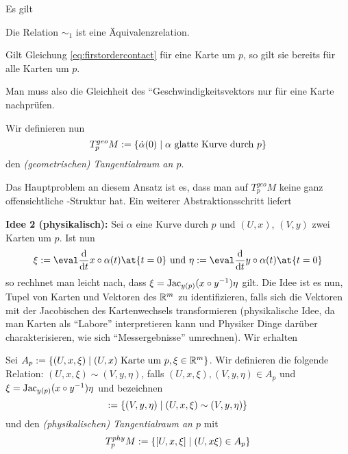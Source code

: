 \begin{proposition}
  Es gilt
  \begin{statements}
  \item Die Relation $\sim_1$ ist eine Äquivalenzrelation.
  \item Gilt Gleichung \eqref{eq:firstordercontact} für eine Karte um
    $p$, so gilt sie bereits für alle Karten um $p$.
  \end{statements}
\end{proposition}
\begin{bemerkung}
  Man muss also die Gleichheit des ``Geschwindigkeitsvektors nur für
  eine Karte nachprüfen.
\end{bemerkung}

\begin{definition}
  Wir definieren nun
  \begin{equation*}
    T^{geo}_pM := \left\lbrace \dot\alpha(0) \mid \alpha \text{ glatte Kurve
        durch $p$} \right\rbrace
  \end{equation*}
  den \emph{(geometrischen) Tangentialraum an $p$}.
\end{definition}

Das Hauptproblem an diesem Ansatz ist es, dass man auf $T^{geo}_pM$ keine ganz
offensichtliche \VR-Struktur hat. Ein weiterer Abstraktionsschritt liefert

\textbf{Idee 2 (physikalisch):} Sei $\alpha$ eine Kurve durch
$p$ und $(U,x)$, $(V,y)$ zwei Karten um $p$. Ist nun
\begin{equation*}
  \xi := \eval\ddt x\circ \alpha(t)\at{t=0}\text{ und }\eta :=
  \eval\ddt y\circ \alpha(t)\at{t=0}
\end{equation*}
so rechhnet man leicht nach, dass $\xi = \operatorname{Jac}_{y(p)}(x\circ
y^{-1})\eta$ gilt. Die Idee ist es nun, Tupel von
Karten und Vektoren des $\mathbb{R}^m$ zu identifizieren, falls sich die
Vektoren mit der Jacobischen des Kartenwechsels transformieren
(physikalische Idee, da man Karten als ``Labore'' interpretieren kann
und Physiker Dinge darüber charakterisieren, wie sich
``Messergebnisse'' umrechnen). Wir erhalten
\begin{definition}
  Sei $A_p := \left\lbrace  (U,x,\xi) \mid (U,x) \text{ Karte um $p$}, \xi \in
    \mathbb{R}^m \right\rbrace$. Wir definieren die folgende Relation: $(U,x,\xi) \sim
  (V,y,\eta)$, falls $(U,x,\xi),(V,y,\eta) \in A_p$ und $\xi =
  \operatorname{Jac}_{y(p)}(x\circ y^{-1})\eta$ und bezeichnen
  \begin{equation*}
    [U,x,\xi] := \set{(V,y,\eta) \mid (U,x,\xi) \sim (V,y,\eta)}
  \end{equation*}
  und den \emph{(physikalischen) Tangentialraum an $p$} mit
  \begin{equation*}
    T^{phy}_pM := \left\lbrace  [U,x,\xi] \mid (U,x\xi) \in A_p  \right\rbrace
  \end{equation*}
\end{definition}

